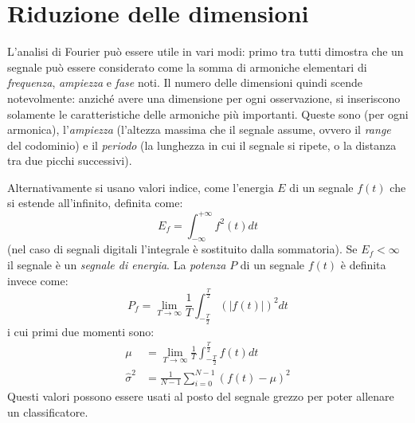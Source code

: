 \documentclass[11pt, a4page]{article}
\begin{document}
\section{Riduzione delle dimensioni}
L'analisi di Fourier può essere utile in vari modi: primo tra tutti dimostra che un segnale può essere considerato come la somma di armoniche elementari di \textit{frequenza}, \textit{ampiezza} e \textit{fase} noti.
Il numero delle dimensioni quindi scende notevolmente: anziché avere una dimensione per ogni osservazione, si inseriscono solamente le caratteristiche delle armoniche più importanti.
Queste sono (per ogni armonica), l'\textit{ampiezza} (l'altezza massima che il segnale assume, ovvero il \textit{range} del codominio) e il \textit{periodo} (la lunghezza in cui il segnale si ripete, o la distanza tra due picchi successivi). \newline

Alternativamente si usano valori indice, come l'energia $E$ di un segnale $f(t)$ che si estende all'infinito, definita come:
\begin{equation*}
  E_f = \int_{-\infty}^{+\infty} f^2(t) dt
\end{equation*}
(nel caso di segnali digitali l'integrale è sostituito dalla sommatoria).
Se $E_f < \infty$ il segnale è un \textit{segnale di energia}.
La \textit{potenza} $P$ di un segnale $f(t)$ è definita invece come:
\begin{equation*}
  P_f = \lim_{T \to \infty} \frac{1}{T}\int_{-\frac{T}{2}}^{\frac{T}{2}}(|f(t)|)^2 dt
\end{equation*}
i cui primi due momenti sono:
\begin{align*}
  \mu &= \lim_{T \to \infty} \frac{1}{T} \int_{-\frac{T}{2}}^{\frac{T}{2}} f(t) dt \\
  \hat{\sigma}^2 &= \frac{1}{N - 1} \sum_{i=0}^{N - 1} (f(t) - \mu)^2
\end{align*}
Questi valori possono essere usati al posto del segnale grezzo per poter allenare un classificatore.
\end{document}
